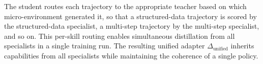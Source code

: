 The student routes each trajectory to the appropriate teacher based on which
micro-environment generated it, so that a structured-data trajectory is scored
by the structured-data specialist, a multi-step trajectory by the multi-step
specialist, and so on.  This per-skill routing enables simultaneous distillation
from all specialists in a single training run.  The resulting unified adapter
$\Delta_{\text{unified}}$ inherits capabilities from all specialists while
maintaining the coherence of a single policy.
